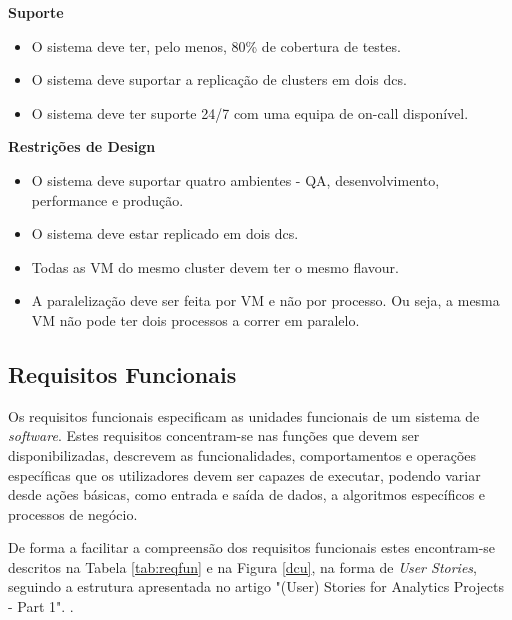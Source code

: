 \textbf{Suporte}
\begin{itemize}
  \item O sistema deve ter, pelo menos, 80\% de cobertura de testes.
  \item O sistema deve suportar a replicação de \glspl{cluster} em dois \glspl{dc}.
  \item O sistema deve ter suporte 24/7 com uma equipa de \gls{on-call} disponível.
\end{itemize}

\textbf{Restrições de Design}
\begin{itemize}
  \item O sistema deve suportar quatro ambientes - \ac{QA}, desenvolvimento, 
    performance e produção.
  \item O sistema deve estar replicado em dois \glspl{dc}.
  \item Todas as \ac{VM} do mesmo \gls{cluster} devem ter o mesmo \gls{flavour}.
  \item A paralelização deve ser feita por \ac{VM} e não por processo. Ou seja, a mesma \ac{VM} 
    não pode ter dois processos a correr em paralelo.
\end{itemize}

\subsection{Requisitos Funcionais}
\label{sec:3-rf}

Os requisitos funcionais especificam as unidades funcionais de um sistema de \textit{software}.
Estes requisitos concentram-se nas funções que devem ser disponibilizadas, descrevem as
funcionalidades, comportamentos e operações específicas que os utilizadores devem ser capazes de 
executar, podendo variar desde ações básicas, como entrada e saída de dados, a algoritmos 
específicos e processos de negócio.

De forma a facilitar a compreensão dos requisitos funcionais estes encontram-se descritos na 
Tabela \ref{tab:reqfun} e na Figura \ref{dcu}, na forma de \textit{User Stories}, seguindo a 
estrutura apresentada no artigo "(User) Stories for Analytics Projects - Part 1". \cite{us}.

